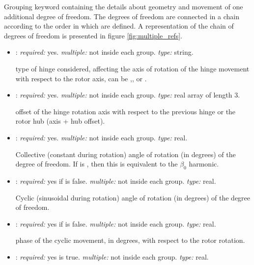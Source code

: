 \begin{itemize}
    Grouping keyword containing the details about geometry and movement of 
    one additional degree of freedom. The degrees of freedom are connected in 
    a chain according to the order in which are defined. A representation of 
    the chain of degrees of freedom is presented in figure \ref{fig:multiple_refs}.
    


    \begin{itemize}
    \item {}: \textit{required:} yes. \textit{multiple:} 
    not inside each  group. \textit{type:} string.
    
    type of hinge considered, affecting the axis of rotation of the hinge 
    movement with respect to the rotor axis, can be ,, or .
    
    \item {}: \textit{required:} yes. \textit{multiple:} 
    not inside each  group. \textit{type:} real array of length 3.
    
    offset of the hinge rotation axis with respect to the previous hinge or 
    the rotor hub (axis + hub offset).
    
    \item {}: \textit{required:} yes. \textit{multiple:} not 
    inside each  group. \textit{type:} real.
    
    Collective (constant during rotation) angle of rotation (in degrees) of 
    the degree of freedom. If  is , then this is equivalent to the 
    $\beta_0$ harmonic.  
    
    \item {}: \textit{required:} yes if  is false. \textit{multiple:} 
    not inside each  group. \textit{type:} real.

    Cyclic (sinusoidal during rotation) angle of rotation (in degrees) of 
    the degree of freedom.
    
    \item {}: \textit{required:} yes if  is false.
    \textit{multiple:} not inside each  group. \textit{type:} real.
    
    phase of the cyclic movement, in degrees, with respect to the rotor rotation. 
    
    \item {}: \textit{required:} yes  is true. 
    \textit{multiple:} not inside each  group. \textit{type:} real. 


\end{itemize}
\end{itemize}
